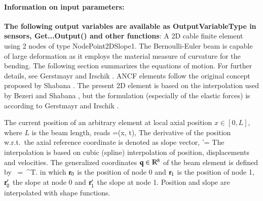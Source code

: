\paragraph{Information on input parameters:} 
\finishTable
{\bf The following output variables are available as OutputVariableType in sensors, Get...Output() and other functions}: 
\finishTable
 \noindent
    A 2D cable finite element using 2 nodes of type NodePoint2DSlope1.
    The Bernoulli-Euler beam is capable of large deformation as it employs the material measure of curvature for the bending.
    The following section summarizes the equations of motion. For further details, see Gerstmayr and Irschik \cite{GerstmayrIrschik2008}.
%
    ANCF elements follow the original concept proposed by Shabana \cite{shabana1997ancf}.
    The present 2D element is based on the interpolation used by Bezeri and Shabana \cite{berzeri2000}, but the formulation (especially of the elastic forces) is according to
    Gerstmayr and Irschik \cite{GerstmayrIrschik2008}.
    
    The current position of an arbitrary element at local axial position $x \in [0,L]$, where $L$ is the beam length, reads
    \be
      \rv=\rv(x, t),
    \ee
    The derivative of the position w.r.t.\ the axial reference coordinate is denoted as slope vector,
    \be
      \rv'= 
    \ee
    The interpolation is based on cubic (spline) interpolation of position, displacements and velocities.
    The generalized coordinates $\mathbf{q} \in \mathbb{R}^8$ of the beam element 
    is defined by
    \be
      \qv\, =\, \left[\, \rv_0^{T}\;\;\rv_0^{' T}\;\; \rv_1^{T}\;\; \rv_1^{' T}\, \right]^{T}.
    \ee
    in which $\mathbf{r}_0$ is the position of node 0 and $\mathbf{r}_1$ is the position of node 1,
    $\mathbf{r}'_0$ the slope at node 0 and $\mathbf{r}'_1$ the slope at node 1.
    Position and slope are interpolated with shape functions.
    
